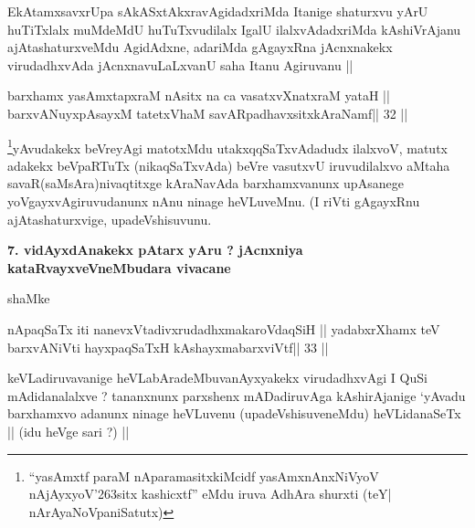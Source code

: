\begin{artha}
EkAtamxsavxrUpa sAkASxtAkxravAgidadxriMda Itanige shaturxvu yArU huTiTxlalx muMdeMdU huTuTxvudilalx IgalU ilalxvAdadxriMda kAshiVrAjanu ajAtashaturxveMdu AgidAdxne, adariMda gAgayxRna jAcnxnakekx virudadhxvAda jAcnxnavuLaLxvanU saha Itanu Agiruvanu ||
\end{artha}

\begin{shl}
barxhamx yasAmxtapxraM nAsitx na ca vasatxvXnatxraM yataH ||
barxvANuyxpAsayxM tatetxV\s haM savARpadhavxsitxkAraNamf\hfill || 32 ||
\end{shl}

\begin{artha}
\footnote[3]{``yasAmxtf paraM nAparamasitxkiMcidf yasAmxnAnxNiVyoV nAjAyxyoV\char'263sitx kashicxtf'' eMdu iruva AdhAra shurxti (teY| nArAyaNoVpaniSatutx)}yAvudakekx beVreyAgi matotxMdu utakxqqSaTxvAdadudx ilalxvoV, matutx adakekx beVpaRTuTx (nikaqSaTxvAda) beVre vasutxvU iruvudilalxvo aMtaha savaR(saMsAra)nivaqtitxge kAraNavAda barxhamxvanunx upAsanege yoVgayxvAgiruvudanunx nAnu ninage heVLuveMnu. (I riVti gAgayxRnu ajAtashaturxvige, upadeVshisuvunu.
\end{artha}

\begin{artha}
{\bf 7. vidAyxdAnakekx pAtarx yAru ? jAcnxniya kataRvayxveVneMbudara vivacane}
\end{artha}

\begin{artha}
shaMke 
\end{artha}

\begin{shl}
\footnotemark[4]nApaqSaTx iti nanevxVtadivxrudadhxmakaroVdaqSiH ||
yadabxrXhamx teV barxvANiVti hayxpaqSaTxH kAshayxmabarxviVtf\hfill || 33 ||
\end{shl}

\begin{artha}
keVLadiruvavanige heVLabAradeMbuvanAyxyakekx virudadhxvAgi I QuSi mAdidanalalxve ? tananxnunx parxshenx mADadiruvAga kAshirAjanige `yAvadu barxhamxvo adanunx ninage heVLuvenu (upadeVshisuveneMdu) heVLidanaSeTx || (idu heVge sari ?) ||
\end{artha}

